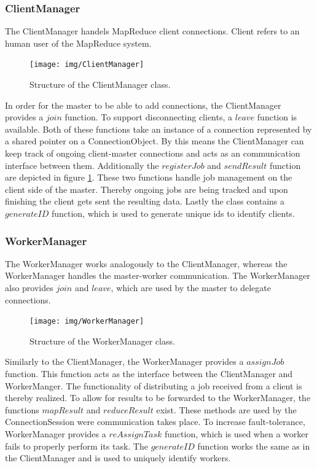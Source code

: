 \documentclass[12pt, letterpaper]{article}
\begin{document}
\subsubsection{ClientManager}

The ClientManager handels MapReduce client connections. Client refers to an human user of the MapReduce system. 

\begin{figure}[h]
	\centering
	\texttt{[image: img/ClientManager]}
	\caption{Structure of the ClientManager class.}
	\label{fig:classes_ClientManager}
\end{figure}

In order for the master to be able to add connections, the ClientManager provides a $join$ function. To support disconnecting clients, a $leave$ function is available. Both of these functions take an instance of a connection represented by a shared pointer on a ConnectionObject. By this means the ClientManager can keep track of ongoing client-master connections and acts as an communication interface between them.\newline 
Additionally the $registerJob$ and $sendResult$ function are depicted in figure \ref{fig:classes_ClientManager}. These two functions handle job management on the client side of the master. Thereby ongoing jobs are being tracked and upon finishing the client gets sent the resulting data. Lastly the class contains a $generateID$ function, which is used to generate unique ids to identify clients.

\subsubsection{WorkerManager}

The WorkerManager works analogously to the ClientManager, whereas the WorkerManager handles the master-worker communication. The WorkerManager also provides $join$ and $leave$, which are used by the master to delegate connections. 

\begin{figure}[h]
	\centering
	\texttt{[image: img/WorkerManager]}
	\caption{Structure of the WorkerManager class.}
	\label{fig:classes_WorkerManager}
\end{figure}

Similarly to the ClientManager, the WorkerManager provides a $assignJob$ function. This function acts as the interface between the ClientManager and WorkerManger. The functionality of distributing a job received from a client is thereby realized. To allow for results to be forwarded to the WorkerManager, the functions $mapResult$ and $reduceResult$ exist. These methods are used by the ConnectionSession were communication takes place.\newline
To increase fault-tolerance, WorkerManager provides a $reAssignTask$ function, which is used when a worker fails to properly perform its task. The $generateID$ function works the same as in the ClientManager and is used to uniquely identify workers.  
\end{document}
